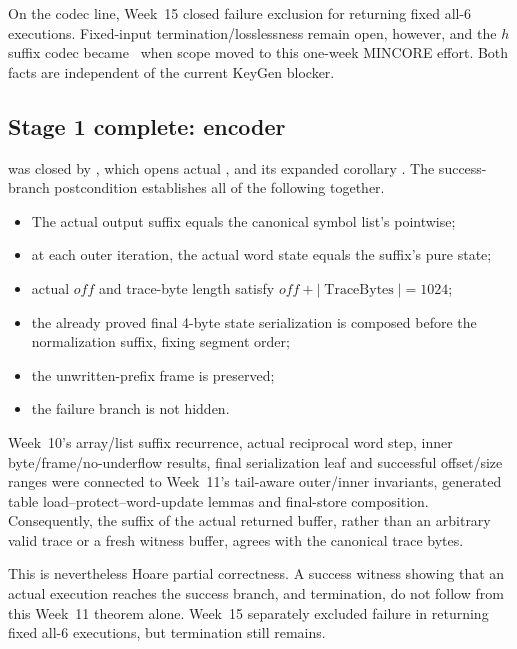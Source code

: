On the codec line, Week~15 closed failure exclusion for returning fixed all-6
executions. Fixed-input termination/losslessness remain open, however, and the
\(h\) suffix codec became \statusdeferred\ when scope moved to this one-week
MINCORE effort. Both facts are independent of the current KeyGen blocker.

\subsection{Stage 1 complete: encoder}

 was closed by
, which opens actual
, and its expanded corollary
. The success-branch
postcondition establishes all of the following together.

\begin{itemize}
  \item The actual output suffix equals the canonical symbol list's
         pointwise;
  \item at each outer iteration, the actual word state equals the suffix's pure
         state;
  \item actual \(off\) and trace-byte length satisfy
        \(off+|\operatorname{TraceBytes}|=1024\);
  \item the already proved final 4-byte state serialization is composed before
        the normalization suffix, fixing segment order;
  \item the unwritten-prefix frame is preserved;
  \item the failure branch is not hidden.
\end{itemize}

Week~10's array/list suffix recurrence, actual reciprocal word step, inner
byte/frame/no-underflow results, final serialization leaf and successful
offset/size ranges were connected to Week~11's tail-aware outer/inner invariants,
generated table load--protect--word-update lemmas and final-store composition.
Consequently, the suffix of the actual returned buffer, rather than an arbitrary
valid trace or a fresh witness buffer, agrees with the canonical trace bytes.

This is nevertheless Hoare partial correctness. A success witness showing that
an actual execution reaches the success branch, and termination, do not follow
from this Week~11 theorem alone. Week~15 separately excluded failure in returning
fixed all-6 executions, but termination still remains.

